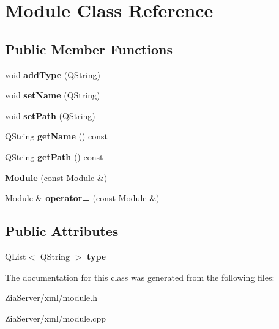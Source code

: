 \hypertarget{class_module}{
\section{Module Class Reference}
\label{class_module}
}
\subsection*{Public Member Functions}
\begin{DoxyCompactItemize}
\item 
\hypertarget{class_module_a09034ae475aca93c53de6f68d0b5fdf4}{
void {\bfseries addType} (QString)}
\label{class_module_a09034ae475aca93c53de6f68d0b5fdf4}

\item 
\hypertarget{class_module_a5ac684440ce769072d08d43b7e1151e6}{
void {\bfseries setName} (QString)}
\label{class_module_a5ac684440ce769072d08d43b7e1151e6}

\item 
\hypertarget{class_module_a7146d5328a353dd742c88e30805e881e}{
void {\bfseries setPath} (QString)}
\label{class_module_a7146d5328a353dd742c88e30805e881e}

\item 
\hypertarget{class_module_a5bbce6b4f2b695d3e114b97ad0ca4f18}{
QString {\bfseries getName} () const }
\label{class_module_a5bbce6b4f2b695d3e114b97ad0ca4f18}

\item 
\hypertarget{class_module_a4e2c6e41fa2f788f6af316beb9476aa3}{
QString {\bfseries getPath} () const }
\label{class_module_a4e2c6e41fa2f788f6af316beb9476aa3}

\item 
\hypertarget{class_module_abbfeaf9d7d7e35ade6dfad50cc043e34}{
{\bfseries Module} (const \hyperlink{class_module}{Module} \&)}
\label{class_module_abbfeaf9d7d7e35ade6dfad50cc043e34}

\item 
\hypertarget{class_module_a23b9518198af877726208c1d6312d4ab}{
\hyperlink{class_module}{Module} \& {\bfseries operator=} (const \hyperlink{class_module}{Module} \&)}
\label{class_module_a23b9518198af877726208c1d6312d4ab}

\end{DoxyCompactItemize}
\subsection*{Public Attributes}
\begin{DoxyCompactItemize}
\item 
\hypertarget{class_module_a509034a09559607535f6372a7552ae89}{
QList$<$ QString $>$ {\bfseries type}}
\label{class_module_a509034a09559607535f6372a7552ae89}

\end{DoxyCompactItemize}


The documentation for this class was generated from the following files:\begin{DoxyCompactItemize}
\item 
ZiaServer/xml/module.h\item 
ZiaServer/xml/module.cpp\end{DoxyCompactItemize}
